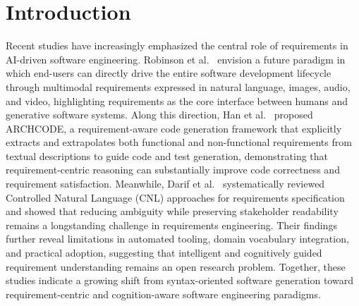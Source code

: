 \section{Introduction}
\label{introduction}

Recent studies have increasingly emphasized the central role of requirements in AI-driven software engineering.
Robinson et al.~\cite{robinsonRequirementsAreAll2025} envision a future paradigm in which end-users can directly drive the entire software development lifecycle through multimodal requirements expressed in natural language, images, audio, and video, highlighting requirements as the core interface between humans and generative software systems.
Along this direction, Han et al.~\cite{hanArchCodeIncorporatingSoftware2024} proposed ARCHCODE, a requirement-aware code generation framework that explicitly extracts and extrapolates both functional and non-functional requirements from textual descriptions to guide code and test generation, demonstrating that requirement-centric reasoning can substantially improve code correctness and requirement satisfaction.
Meanwhile, Darif et al.~\cite{darifControlledNaturalLanguage2026} systematically reviewed Controlled Natural Language (CNL) approaches for requirements specification and showed that reducing ambiguity while preserving stakeholder readability remains a longstanding challenge in requirements engineering.
Their findings further reveal limitations in automated tooling, domain vocabulary integration, and practical adoption, suggesting that intelligent and cognitively guided requirement understanding remains an open research problem.
Together, these studies indicate a growing shift from syntax-oriented software generation toward requirement-centric and cognition-aware software engineering paradigms.
